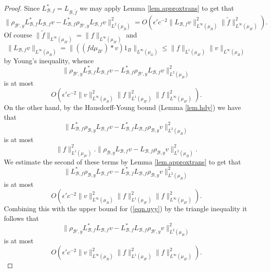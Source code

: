 \documentclass[12pt]{amsart}
\numberwithin{equation}{section}
\theoremstyle{plain}
\theoremstyle{definition}
\renewcommand{\leq}{\leqslant}
\begin{document}
\begin{proof}
Since $L_{\mathcal{B},f}^*=L_{\mathcal{B},\tilde{f}}$ we may apply Lemma \ref{lem.approxtrans} to get that
\begin{equation*}
\|\rho_{\mathcal{B}',y}L_{\mathcal{B},f}^*L_{\mathcal{B},f}v - L_{\mathcal{B},f}^*\rho_{\mathcal{B}',y}L_{\mathcal{B},f}v\|_{L^2(\mu_B)}^2=O(\epsilon'c^{-2}\|L_{\mathcal{B},f}v\|_{L^\infty(\mu_B)}^2\|\tilde{f}\|_{L^\infty(\mu_{B'})}^2).
\end{equation*}
Of course $\|\tilde{f}\|_{L^\infty(\mu_{B'})} = \|f\|_{L^\infty(\mu_{B'})}$ and
\begin{equation*}
\|L_{\mathcal{B},f}v\|_{L^\infty(\mu_B)} = \|((fd\mu_{B'}) \ast v)1_B\|_{L^\infty(\mu_G)} \leq \|f\|_{L^1(\mu_{B'})}\|v\|_{L^\infty(\mu_B)}
\end{equation*}
by Young's inequality, whence
\begin{equation}\label{eqn.uyy}
\|\rho_{\mathcal{B}',y}L_{\mathcal{B},f}^*L_{\mathcal{B},f}v - L_{\mathcal{B},f}^*\rho_{\mathcal{B}',y}L_{\mathcal{B},f}v\|_{L^2(\mu_B)}^2
\end{equation}
is at most
\begin{equation*}
O(\epsilon'c^{-2}\|v\|_{L^\infty(\mu_B)}^2\|f\|_{L^1(\mu_{B'})}^2\|f\|_{L^\infty(\mu_{B'})}^2).
\end{equation*}
On the other hand, by the Hausdorff-Young bound (Lemma \ref{lem.hdy}) we have that
\begin{equation*}
\|L_{\mathcal{B},f}^*\rho_{\mathcal{B},y}L_{\mathcal{B},f}v - L_{\mathcal{B},f}^*L_{\mathcal{B},f}\rho_{\mathcal{B},y}v\|_{L^2(\mu_B)}^2
\end{equation*}
is at most
\begin{equation*}
\|f\|_{L^1(\mu_{B'})}^2.\|\rho_{\mathcal{B},y}L_{\mathcal{B},f}v - L_{\mathcal{B},f}\rho_{\mathcal{B},y}v\|_{L^2(\mu_B)}^2.
\end{equation*}
We estimate the second of these terms by Lemma \ref{lem.approxtrans} to get that
\begin{equation*}
\|L_{\mathcal{B},f}^*\rho_{\mathcal{B},y}L_{\mathcal{B},f}v - L_{\mathcal{B},f}^*L_{\mathcal{B},f}\rho_{\mathcal{B},y}v\|_{L^2(\mu_B)}^2
\end{equation*}
is at most
\begin{equation*}
O(\epsilon'c^{-2}\|v\|_{L^\infty(\mu_B)}^2\|f\|_{L^1(\mu_{B'})}^2\|f\|_{L^\infty(\mu_{B'})}^2).
\end{equation*}
Combining this with the upper bound for (\ref{eqn.uyy}) by the triangle inequality it follows that
\begin{equation*}
\|\rho_{\mathcal{B}',y}L_{\mathcal{B},f}^*L_{\mathcal{B},f}v - L_{\mathcal{B},f}^*L_{\mathcal{B},f}\rho_{\mathcal{B}',y}v\|_{L^2(\mu_B)}^2
\end{equation*}
is at most
\begin{equation*}
O(\epsilon'c^{-2}\|v\|_{L^\infty(\mu_B)}^2\|f\|_{L^1(\mu_{B'})}^2\|f\|_{L^\infty(\mu_{B'})}^2).
\end{equation*}


\end{proof}
\end{document}
